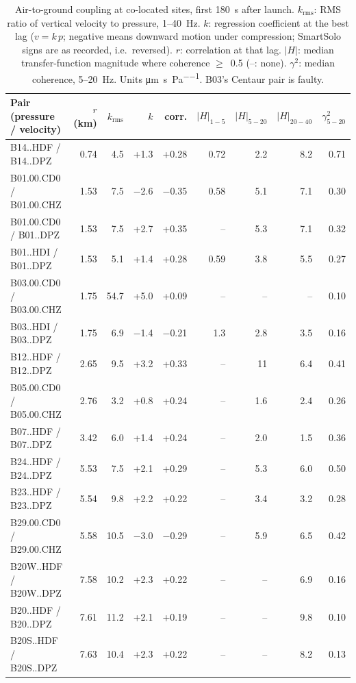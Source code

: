 \begin{table}[htbp]
  \centering
  \caption{Air-to-ground coupling at co-located sites, first 180~s after launch. $k_\text{rms}$: RMS ratio of vertical velocity to pressure, 1--40~Hz. $k$: regression coefficient at the best lag ($v = k\,p$; negative means downward motion under compression; SmartSolo signs are as recorded, i.e.\ reversed). $r$: correlation at that lag. $|H|$: median transfer-function magnitude where coherence $\geq$~0.5 (--: none). $\gamma^2$: median coherence, 5--20~Hz. Units \si{\micro\metre\per\second\per\pascal}. B03's Centaur pair is faulty.}
  \label{tab:coupling}
  \scriptsize
  \begin{tabular}{lrrrrrrrr}
  \toprule
  Pair (pressure / velocity) & $r$ (km) & $k_\text{rms}$ & $k$ & corr. & $|H|_{1-5}$ & $|H|_{5-20}$ & $|H|_{20-40}$ & $\gamma^2_{5-20}$ \\
  \midrule
  B14..HDF / B14..DPZ & 0.74 & 4.5 & +1.3 & +0.28 & 0.72 & 2.2 & 8.2 & 0.71 \\
  B01.00.CD0 / B01.00.CHZ & 1.53 & 7.5 & $-$2.6 & $-$0.35 & 0.58 & 5.1 & 7.1 & 0.30 \\
  B01.00.CD0 / B01..DPZ & 1.53 & 7.5 & +2.7 & +0.35 & -- & 5.3 & 7.1 & 0.32 \\
  B01..HDI / B01..DPZ & 1.53 & 5.1 & +1.4 & +0.28 & 0.59 & 3.8 & 5.5 & 0.27 \\
  B03.00.CD0 / B03.00.CHZ & 1.75 & 54.7 & +5.0 & +0.09 & -- & -- & -- & 0.10 \\
  B03..HDI / B03..DPZ & 1.75 & 6.9 & $-$1.4 & $-$0.21 & 1.3 & 2.8 & 3.5 & 0.16 \\
  B12..HDF / B12..DPZ & 2.65 & 9.5 & +3.2 & +0.33 & -- & 11 & 6.4 & 0.41 \\
  B05.00.CD0 / B05.00.CHZ & 2.76 & 3.2 & +0.8 & +0.24 & -- & 1.6 & 2.4 & 0.26 \\
  B07..HDF / B07..DPZ & 3.42 & 6.0 & +1.4 & +0.24 & -- & 2.0 & 1.5 & 0.36 \\
  B24..HDF / B24..DPZ & 5.53 & 7.5 & +2.1 & +0.29 & -- & 5.3 & 6.0 & 0.50 \\
  B23..HDF / B23..DPZ & 5.54 & 9.8 & +2.2 & +0.22 & -- & 3.4 & 3.2 & 0.28 \\
  B29.00.CD0 / B29.00.CHZ & 5.58 & 10.5 & $-$3.0 & $-$0.29 & -- & 5.9 & 6.5 & 0.42 \\
  B20W..HDF / B20W..DPZ & 7.58 & 10.2 & +2.3 & +0.22 & -- & -- & 6.9 & 0.16 \\
  B20..HDF / B20..DPZ & 7.61 & 11.2 & +2.1 & +0.19 & -- & -- & 9.8 & 0.10 \\
  B20S..HDF / B20S..DPZ & 7.63 & 10.4 & +2.3 & +0.22 & -- & -- & 8.2 & 0.13 \\
  \bottomrule
  \end{tabular}
\end{table}
